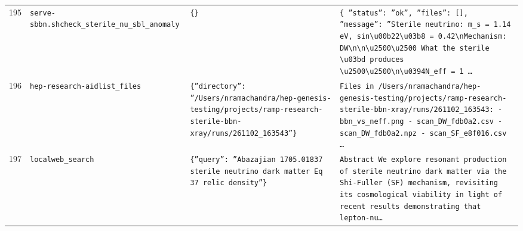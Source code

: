 \documentclass[11pt,a4paper]{article}
\begin{document}
\begin{longtable}{@{}p{}p{}p{}p{}@{}}
195 & \texttt{serve-sbbn.sh}\newline\texttt{check\_\allowbreak{}sterile\_\allowbreak{}nu\_\allowbreak{}sbl\_\allowbreak{}anomaly} & \texttt{\{\}\allowbreak{}} & \texttt{\{   ''status'':\allowbreak{} ''ok'',\allowbreak{}   ''files'':\allowbreak{} []\allowbreak{},\allowbreak{}   ''message'':\allowbreak{} ''Sterile neutrino:\allowbreak{} m\_\allowbreak{}s =\allowbreak{} 1.14 eV,\allowbreak{} sin\textbackslash{}\allowbreak{}u00b22\textbackslash{}\allowbreak{}u03b8 =\allowbreak{} 0.42\textbackslash{}\allowbreak{}nMechanism:\allowbreak{} DW\textbackslash{}\allowbreak{}n\textbackslash{}\allowbreak{}n\textbackslash{}\allowbreak{}u2500\textbackslash{}\allowbreak{}u2500 What the sterile \textbackslash{}\allowbreak{}u03bd produces \textbackslash{}\allowbreak{}u2500\textbackslash{}\allowbreak{}u2500\textbackslash{}\allowbreak{}n\textbackslash{}\allowbreak{}u0394N\_\allowbreak{}eff =\allowbreak{} 1 \ldots{}\allowbreak{}} \\
196 & \texttt{hep-research-aid}\newline\texttt{list\_\allowbreak{}files} & \texttt{\{''directory'':\allowbreak{} ''/\allowbreak{}Users/\allowbreak{}nramachandra/\allowbreak{}hep-genesis-testing/\allowbreak{}projects/\allowbreak{}ramp-research-sterile-bbn-xray/\allowbreak{}runs/\allowbreak{}261102\_\allowbreak{}163543''\}\allowbreak{}} & \texttt{Files in /\allowbreak{}Users/\allowbreak{}nramachandra/\allowbreak{}hep-genesis-testing/\allowbreak{}projects/\allowbreak{}ramp-research-sterile-bbn-xray/\allowbreak{}runs/\allowbreak{}261102\_\allowbreak{}163543:\allowbreak{}   - bbn\_\allowbreak{}vs\_\allowbreak{}neff.png   - scan\_\allowbreak{}DW\_\allowbreak{}fdb0a2.csv   - scan\_\allowbreak{}DW\_\allowbreak{}fdb0a2.npz   - scan\_\allowbreak{}SF\_\allowbreak{}e8f016.csv   \ldots{}\allowbreak{}} \\
197 & \texttt{local}\newline\texttt{web\_\allowbreak{}search} & \texttt{\{''query'':\allowbreak{} ''Abazajian 1705.01837 sterile neutrino dark matter Eq 37 relic density''\}\allowbreak{}} & \texttt{Abstract We explore resonant production of sterile neutrino dark matter via the Shi-Fuller (SF)\allowbreak{} mechanism,\allowbreak{} revisiting its cosmological viability in light of recent results demonstrating that lepton-nu\ldots{}\allowbreak{}} \\

\end{longtable}
\end{document}
